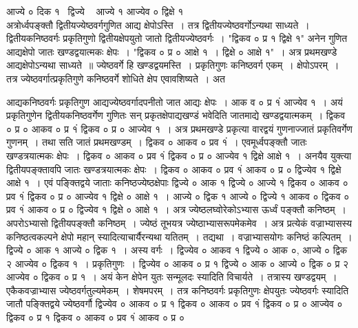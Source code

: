 \documentclass[11pt, openany]{book}
\begin{document}
 \vspace{-6mm}
 आज्ये ० दिक १ ~द्विज्ये ~ आज्ये १ आज्येव ० द्विक्षे १ \\

\vspace{-3mm}
 अत्रोर्ध्वपङ्क्तौ द्वितीयज्येष्ठवर्गगुणित आद्य क्षेपोऽस्ति~। तत्र
द्वितीयज्येष्ठवर्गोऽन्यथा साध्यते~। द्वितीयकनिष्ठवर्गः प्रकृतिगुणो
द्वितीयक्षेपयुतो जातो द्वितीयज्येष्ठवर्गः~। "द्विकव ० प्र १ द्विक्षे १" अनेन गुणित 
आद्यक्षेपो जातः खण्डद्वयात्मकः क्षेपः~। "द्विकव ० प्र ० आक्षे १~। द्विक्षे ० आक्षे १"~। अत्र प्रथमखण्डे आद्यक्षेपोऽन्यथा साध्यते~॥ ज्येष्ठवर्गे हि खण्डद्वयमस्ति~। प्रकृतिगुणः कनिष्ठवर्ग एकम्~। क्षेपोऽपरम्~। तत्र ज्येष्ठवर्गात्प्रकृतिगुणे कनिष्ठवर्गे शोधिते क्षेप एवावशिष्यते~। अत
\newpage

\noindent आद्यकनिष्ठवर्गः प्रकृतिगुण आद्यज्येष्ठवर्गादपनीतो जात आद्यः क्षेपः~। 
आक व ० प्र १ं आज्येव १~। अयं प्रकृतिगुणेन द्वितीयकनिष्ठवर्गेण गुणितः 
सन् प्रकृतक्षेपाद्यखण्डं भवेदिति जातमाद्ये खण्डद्वयात्मकम्~। द्विकव ० प्र ० 
आकव ० प्र १ं द्विकव ० प्र ० आज्येव १~। अत्र प्रथमखण्डे 
प्रकृत्या वारद्वयं गुणनाज्जातं प्रकृतिवर्गेण गुणनम्~। तथा सति जातं
प्रथमखण्डम्~। द्विकव ० आकव ० प्रव १ं~। एवमूर्ध्वपङ्क्तौ जातः 
खण्डत्रयात्मकः क्षेपः~। द्विकव ० आकव ० प्रव १ं द्विकव ० प्र ० 
आज्येव १ द्विक्षे आक्षे १~। अनयैव युक्त्या द्वितीयपङ्क्तावपि जातः 
खण्डत्रयात्मकः क्षेपः~। द्विकव ० आकव ० प्रव १ं आकव ० प्र ० 
द्विज्येव १ द्विक्षे आक्षे १~। एवं पङ्क्तिद्वये जाताः कनिष्ठज्येष्ठक्षेपाः 
द्विज्ये ० आक १ द्विज्ये ० आज्ये १ द्विकव ० आकव ० प्रव १ं 
द्विकव ० प्र ० आज्येव १ द्विक्षे ० आक्षे १~। आज्ये ० द्विक १ आज्ये ० 
द्विज्ये १ आकव ० द्विकव ० प्रव १ं आकव ० प्र ० द्विज्येव १ 
द्विक्षे ० आक्षे १~। अत्र ज्येष्ठलघ्वोरेकोऽभ्यास ऊर्ध्वं पङ्क्तौ कनिष्ठम्~। 
अपरोऽभ्यासो द्वितीयपङ्क्तौ कनिष्ठम्~। ज्येष्ठं तूभयत्र ज्येष्ठाभ्यासरूपमेकमेव~। अत्र प्रत्येकं वज्राभ्यासस्य कनिष्ठत्वकल्पने क्षेपो महान् 
स्यादित्याचार्यैरन्यथा यतितम्~। तद्यथा~। वज्राभ्यासयोगः कनिष्ठं 
कल्पितम्~। द्विज्ये ० आक १ आज्ये ० द्विक १~। अस्य वर्गः~। 
द्विज्येव ० आकव १ द्विज्ये ० आक ०, आज्ये ० द्विक २ आज्येव ० 
द्विकव १~। प्रकृतिगुणः~। द्विज्येव ० आकव ० प्र १ द्विज्ये ० आक ० 
आज्ये ० द्विक ० प्र २ आज्येव ० द्विकव ० प्र १~। अयं केन 
क्षेपेन युतः सन्मूलदः स्यादिति विचार्यते~। तत्रास्य खण्डद्वयम्~।
एकैकवज्राभ्यास ज्येष्ठवर्गतुल्यमेकम्~। शेषमपरम्~। तत्र कनिष्ठवर्गः
प्रकृतिगुणः क्षेपयुतः ज्येष्ठवर्गः स्यादिति जातौ पङ्क्तिद्वये ज्येष्ठवर्गौ 
द्विज्येव ० आकव ० प्र १ द्विकव ० आकव ० प्रव १ं द्विकव ० प्र ० 
आज्येव ० द्विकव ० प्र १ द्विकव ० आकव ० प्रव १ं आकव ० प्र ०
\newpage
\end{document}
